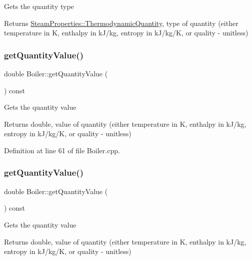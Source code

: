 Gets the quantity type \begin{DoxyReturn}{Returns}
\hyperlink{class_steam_properties_ae0294bedf7d178c2d8fb6aed0f62fbff}{Steam\+Properties\+::\+Thermodynamic\+Quantity}, type of quantity (either temperature in K, enthalpy in k\+J/kg, entropy in k\+J/kg/K, or quality -\/ unitless) 
\end{DoxyReturn}
\mbox{\label{class_boiler_a78370a174135e6cc95abcd3b7ac2f947}} 
\subsubsection{\texorpdfstring{get\+Quantity\+Value()}{getQuantityValue()}\hspace{0.1cm}{\footnotesize\ttfamily [1/3]}}
{\footnotesize\ttfamily double Boiler\+::get\+Quantity\+Value (\begin{DoxyParamCaption}{ }\end{DoxyParamCaption}) const}

Gets the quantity value \begin{DoxyReturn}{Returns}
double, value of quantity (either temperature in K, enthalpy in k\+J/kg, entropy in k\+J/kg/K, or quality -\/ unitless) 
\end{DoxyReturn}


Definition at line 61 of file Boiler.\+cpp.

\mbox{\label{class_boiler_a78370a174135e6cc95abcd3b7ac2f947}} 
\subsubsection{\texorpdfstring{get\+Quantity\+Value()}{getQuantityValue()}\hspace{0.1cm}{\footnotesize\ttfamily [2/3]}}
{\footnotesize\ttfamily double Boiler\+::get\+Quantity\+Value (\begin{DoxyParamCaption}{ }\end{DoxyParamCaption}) const}

Gets the quantity value \begin{DoxyReturn}{Returns}
double, value of quantity (either temperature in K, enthalpy in k\+J/kg, entropy in k\+J/kg/K, or quality -\/ unitless) 
\end{DoxyReturn}
\mbox{\label{class_boiler_a78370a174135e6cc95abcd3b7ac2f947}} 
